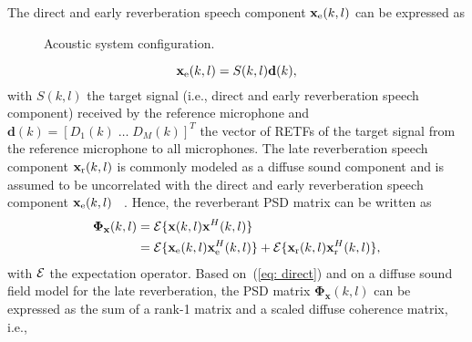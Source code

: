 \documentclass{article}
\begin{document}
The direct and early reverberation speech component $\mathbf{x}_{\rm e}(k,l)$ can be expressed as
\begin{figure}[t!]
  
  \caption{Acoustic system configuration.}
  \label{fig: ac_sys}
\end{figure} %
\begin{equation}
\label{eq: direct}
\mathbf{x}_{\rm e}(k,l) = S(k,l)\mathbf{d}(k),
\end{equation}
with $S(k,l)$ the target signal (i.e., direct and early reverberation speech component) received by the reference microphone and $\mathbf{d}(k) = [D_1(k) \; \ldots \; D_M(k)]^T$ the vector of RETFs of the target signal from the reference microphone to all microphones.
The late reverberation speech component $\mathbf{x}_{\rm r}(k,l)$ is commonly modeled as a diffuse sound component and is assumed to be uncorrelated with the direct and early reverberation speech component $\mathbf{x}_{\rm e}(k,l)$ ~\cite{Braun_EUSIPCO_2013,Kuklasinski_EUSIPCO_2014g,Schwartz_WASPAA_2015,Braun_EURASIP_2015,Schwartz_ICASSP_2016,Kuklasinski_ITASLP_2016,Schwartz_EUSIPCO_2016, Kodrasi_HSCMA_2017, Kodrasi_ICASSP_2017}.
Hence, the reverberant PSD matrix can be written as
\begin{align}
  \boldsymbol{\Phi}_{\mathbf{x}}(k,l) & = {\cal{E}} \{\mathbf{x}(k,l) \mathbf{x}^H(k,l)\} \\
  & = {\cal{E}} \{\mathbf{x}_{\rm e}(k,l) \mathbf{x}_{\rm e}^H(k,l)\} + {\cal{E}} \{\mathbf{x}_{\rm r}(k,l) \mathbf{x}_{\rm r}^H(k,l)\},
\end{align}
with ${\cal{E}}$ the expectation operator.
Based on~(\ref{eq: direct}) and on a diffuse sound field model for the late reverberation, the PSD matrix $\boldsymbol{\Phi}_{\mathbf{x}}(k,l)$ can be expressed as the sum of a rank-1 matrix and a scaled diffuse coherence matrix, i.e.,
\end{document}
